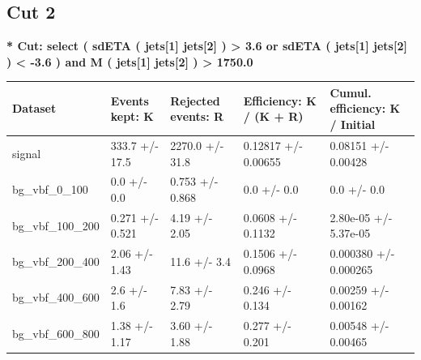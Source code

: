 \documentclass[a4paper, 10pt]{article}
\begin{document}
   \newpage
\subsection{Cut 2}

\textbf{* Cut: select ( sdETA ( jets[1] jets[2] ) > 3.6 or sdETA ( jets[1] jets[2] ) < -3.6 ) and M ( jets[1] jets[2] ) > 1750.0}\\
   \begin{table}[H]
  \begin{center}
    \begin{tabular}{|m{20.0mm}|m{27.0mm}|m{27.0mm}|m{33.0mm}|m{32.0mm}|}
      \hline
      {\cellcolor{yellow}         Dataset}& {\cellcolor{yellow}         Events kept:
          K}& {\cellcolor{yellow}         Rejected events:
          R}& {\cellcolor{yellow}         Efficiency:
          K /\- (K + R)}& {\cellcolor{yellow}         Cumul. efficiency:
          K /\- Initial}\\
      \hline
      {\cellcolor{white}         signal}& {\cellcolor{white}         333.7 +/\-- 17.5}& {\cellcolor{white}         2270.0 +/\-- 31.8}& {\cellcolor{white}         0.12817 +/\-- 0.00655}& {\cellcolor{white}         0.08151 +/\-- 0.00428}\\
      \hline
      {\cellcolor{white}         bg\_vbf\_0\_100}& {\cellcolor{white}         0.0 +/\-- 0.0}& {\cellcolor{white}         0.753 +/\-- 0.868}& {\cellcolor{white}         0.0 +/\-- 0.0}& {\cellcolor{white}         0.0 +/\-- 0.0}\\
      \hline
      {\cellcolor{white}         bg\_vbf\_100\_200}& {\cellcolor{white}         0.271 +/\-- 0.521}& {\cellcolor{white}         4.19 +/\-- 2.05}& {\cellcolor{white}         0.0608 +/\-- 0.1132}& {\cellcolor{white}         2.80e-05 +/\-- 5.37e-05}\\
      \hline
      {\cellcolor{white}         bg\_vbf\_200\_400}& {\cellcolor{white}         2.06 +/\-- 1.43}& {\cellcolor{white}         11.6 +/\-- 3.4}& {\cellcolor{white}         0.1506 +/\-- 0.0968}& {\cellcolor{white}         0.000380 +/\-- 0.000265}\\
      \hline
      {\cellcolor{white}         bg\_vbf\_400\_600}& {\cellcolor{white}         2.6 +/\-- 1.6}& {\cellcolor{white}         7.83 +/\-- 2.79}& {\cellcolor{white}         0.246 +/\-- 0.134}& {\cellcolor{white}         0.00259 +/\-- 0.00162}\\
      \hline
      {\cellcolor{white}         bg\_vbf\_600\_800}& {\cellcolor{white}         1.38 +/\-- 1.17}& {\cellcolor{white}         3.60 +/\-- 1.88}& {\cellcolor{white}         0.277 +/\-- 0.201}& {\cellcolor{white}         0.00548 +/\-- 0.00465}\\

\end{tabular}
\end{center}
\end{table}
\end{document}
